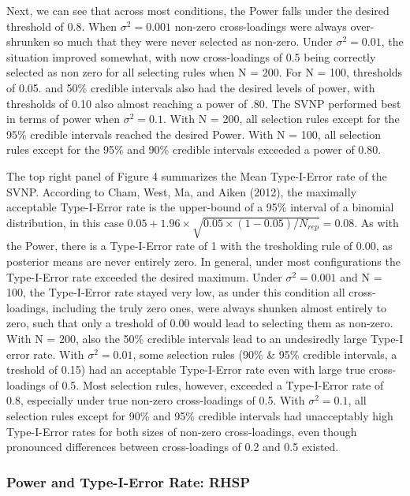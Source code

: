 \documentclass[
  english,
  man, donotrepeattitle,floatsintext]{apa6}
\begin{document}
Next, we can see that across most conditions, the Power falls under the desired threshold of 0.8. When \(\sigma^2 = 0.001\) non-zero cross-loadings were always over-shrunken so much that they were never selected as non-zero. Under \(\sigma^2 = 0.01\), the situation improved somewhat, with now cross-loadings of 0.5 being correctly selected as non zero for all selecting rules when N = 200. For N = 100, thresholds of 0.05. and 50\% credible intervals also had the desired levels of power, with thresholds of 0.10 also almost reaching a power of .80. The SVNP performed best in terms of power when \(\sigma^2 = 0.1\). With N = 200, all selection rules except for the 95\% credible intervals reached the desired Power. With N = 100, all selection rules except for the 95\% and 90\% credible intervals exceeded a power of 0.80.

The top right panel of Figure 4 summarizes the Mean Type-I-Error rate of the SVNP. According to Cham, West, Ma, and Aiken (2012), the maximally acceptable Type-I-Error rate is the upper-bound of a 95\% interval of a binomial distribution, in this case \(0.05 + 1.96 \times \sqrt{0.05 \times (1-0.05)/ N_{rep}} = 0.08\). As with the Power, there is a Type-I-Error rate of 1 with the tresholding rule of 0.00, as posterior means are never entirely zero. In general, under most configurations the Type-I-Error rate exceeded the desired maximum. Under \(\sigma^2 = 0.001\) and N = 100, the Type-I-Error rate stayed very low, as under this condition all cross-loadings, including the truly zero ones, were always shunken almost entirely to zero, such that only a treshold of 0.00 would lead to selecting them as non-zero. With N = 200, also the 50\% credible intervals lead to an undesiredly large Type-I error rate. With \(\sigma^2 = 0.01\), some selection rules (90\% \& 95\% credible intervals, a treshold of 0.15) had an acceptable Type-I-Error rate even with large true cross-loadings of 0.5. Most selection rules, however, exceeded a Type-I-Error rate of 0.8, especially under true non-zero cross-loadings of 0.5. With \(\sigma^2 = 0.1\), all selection rules except for 90\% and 95\% credible intervals had unacceptably high Type-I-Error rates for both sizes of non-zero cross-loadings, even though pronounced differences between cross-loadings of 0.2 and 0.5 existed.

\hypertarget{power-and-type-i-error-rate-rhsp}{%
\subsubsection{Power and Type-I-Error Rate: RHSP}\label{power-and-type-i-error-rate-rhsp}}
\end{document}

